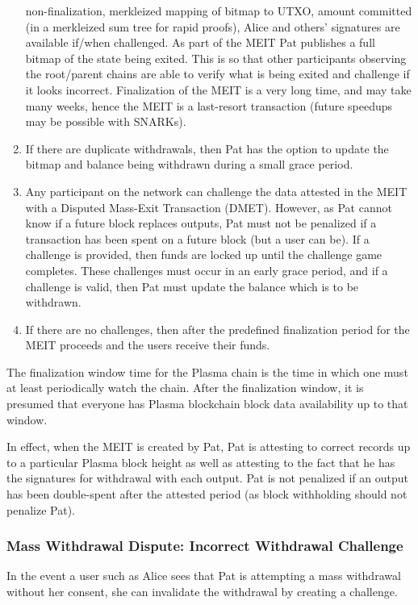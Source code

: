 \documentclass[letterpaper, 11pt]{article}
\begin{document}
\begin{enumerate}
		non-finalization, merkleized mapping of bitmap to UTXO, amount
		committed (in a merkleized sum tree for rapid proofs), Alice and
		others' signatures are available if/when challenged. As part of
		the MEIT Pat publishes a full bitmap of the state being exited.
		This is so that other participants observing the root/parent
		chains are able to verify what is being exited and challenge if
		it looks incorrect. Finalization of the MEIT is a very long
		time, and may take many weeks, hence the MEIT is a last-resort
		transaction (future speedups may be possible with SNARKs).
	\item
		If there are duplicate withdrawals, then Pat has the option to
		update the bitmap and balance being withdrawn during a small
		grace period.
	\item
		Any participant on the network can challenge the data attested
		in the MEIT with a Disputed Mass-Exit Transaction (DMET).
		However, as Pat cannot know if a future block replaces outputs,
		Pat must not be penalized if a transaction has been spent on a
		future block (but a user can be). If a challenge is provided,
		then funds are locked up until the challenge game completes.
		These challenges must occur in an early grace period, and if a
		challenge is valid, then Pat must update the balance which is to
		be withdrawn.
	\item
		If there are no challenges, then after the predefined
		finalization period for the MEIT proceeds and the users receive
		their funds.
\end{enumerate}

The finalization window time for the Plasma chain is the time in which one must
at least periodically watch the chain. After the finalization window, it is
presumed that everyone has Plasma blockchain block data availability up to that
window.

In effect, when the MEIT is created by Pat, Pat is attesting to correct records
up to a particular Plasma block height as well as attesting to the fact that he
has the signatures for withdrawal with each output. Pat is not penalized if an
output has been double-spent after the attested period (as block withholding
should not penalize Pat).

\subsubsection{Mass Withdrawal Dispute: Incorrect Withdrawal Challenge}

In the event a user such as Alice sees that Pat is attempting a mass withdrawal
without her consent, she can invalidate the withdrawal by creating a challenge.
\end{document}
